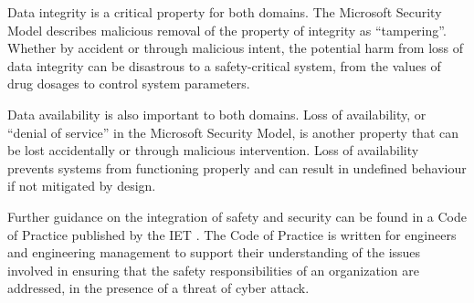 Data integrity is a critical property for both domains. The Microsoft Security Model describes malicious removal of the property of integrity as ``tampering''. Whether by accident or through malicious intent, the potential harm from loss of data integrity can be disastrous to a safety-critical system, from the values of drug dosages to control system parameters. 

Data \gls{availability} is also important to both domains. Loss of \gls{availability}, or ``denial of service'' in the Microsoft Security Model, is another property that can be lost accidentally or through malicious intervention. Loss of \gls{availability} prevents systems from functioning properly and can result in undefined behaviour if not mitigated by design.

Further guidance on the integration of safety and security can be found in a Code of Practice published by the IET
\cite{citation:IetCyber}.
The Code of Practice is written for engineers and engineering management to support their understanding of the issues
involved in ensuring that the safety responsibilities of an organization are addressed, in the presence of a threat of
cyber attack.
